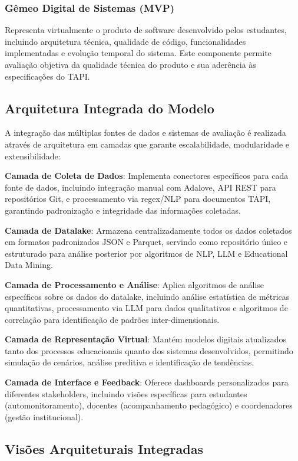 \documentclass[12pt, a4paper, oneside]{abntex2}
\begin{document}
\subsubsection{Gêmeo Digital de Sistemas (MVP)}

Representa virtualmente o produto de software desenvolvido pelos estudantes, incluindo arquitetura técnica, qualidade de código, funcionalidades implementadas e evolução temporal do sistema. Este componente permite avaliação objetiva da qualidade técnica do produto e sua aderência às especificações do TAPI.

\subsection{Arquitetura Integrada do Modelo}

A integração das múltiplas fontes de dados e sistemas de avaliação é realizada através de arquitetura em camadas que garante escalabilidade, modularidade e extensibilidade:

\textbf{Camada de Coleta de Dados}: Implementa conectores específicos para cada fonte de dados, incluindo integração manual com Adalove, API REST para repositórios Git, e processamento via regex/NLP para documentos TAPI, garantindo padronização e integridade das informações coletadas.

\textbf{Camada de Datalake}: Armazena centralizadamente todos os dados coletados em formatos padronizados JSON e Parquet, servindo como repositório único e estruturado para análise posterior por algoritmos de NLP, LLM e Educational Data Mining.

\textbf{Camada de Processamento e Análise}: Aplica algoritmos de análise específicos sobre os dados do datalake, incluindo análise estatística de métricas quantitativas, processamento via LLM para dados qualitativos e algoritmos de correlação para identificação de padrões inter-dimensionais.

\textbf{Camada de Representação Virtual}: Mantém modelos digitais atualizados tanto dos processos educacionais quanto dos sistemas desenvolvidos, permitindo simulação de cenários, análise preditiva e identificação de tendências.

\textbf{Camada de Interface e Feedback}: Oferece dashboards personalizados para diferentes stakeholders, incluindo visões específicas para estudantes (automonitoramento), docentes (acompanhamento pedagógico) e coordenadores (gestão institucional).

\subsection{Visões Arquiteturais Integradas}
\end{document}
